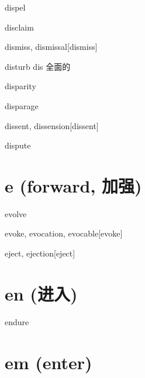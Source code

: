\begin{RefWord}{dispel}
\end{RefWord}

\begin{RefWord}{disclaim}
\end{RefWord}

\begin{RefWord}{dismiss, dismissal}[dismiss]
\end{RefWord}

\begin{RefWord}{disturb}
    dis 全面的
\end{RefWord}

\begin{RefWord}{disparity}
\end{RefWord}

\begin{RefWord}{disparage}
\end{RefWord}

\begin{RefWord}{dissent, dissension}[dissent]
\end{RefWord}


\begin{RefWord}{dispute}
\end{RefWord}

\section{e (forward, 加强)}

\begin{RefWord}{evolve}
\end{RefWord}

\begin{RefWord}{evoke, evocation, evocable}[evoke]
\end{RefWord}

\begin{RefWord}{eject, ejection}[eject]
\end{RefWord}

\section{en (进入)}
\begin{RefWord}{endure}
\end{RefWord}

\section{em (enter)}

